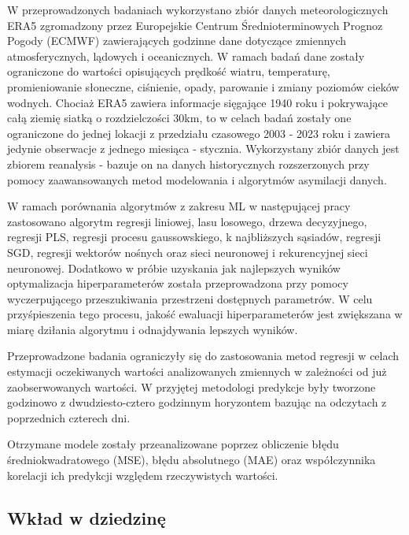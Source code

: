 W przeprowadzonych badaniach wykorzystano zbiór danych meteorologicznych ERA5
zgromadzony przez Europejskie Centrum Średnioterminowych Prognoz Pogody (ECMWF)
zawierających godzinne dane dotyczące zmiennych atmosferycznych, lądowych i
oceanicznych. W ramach badań dane zostały ograniczone do wartości opisujących
prędkość wiatru, temperaturę, promieniowanie słoneczne, ciśnienie, opady, parowanie i
zmiany poziomów cieków wodnych. Chociaż ERA5 zawiera informacje sięgające 1940
roku i pokrywające całą ziemię siatką o rozdzielczości 30km, 
to w celach badań zostały one ograniczone do jednej lokacji z przedziału czasowego 
2003 - 2023 roku i zawiera jedynie obserwacje z jednego miesiąca - stycznia. 
Wykorzystany zbiór danych jest zbiorem reanalysis - bazuje on na 
danych historycznych rozszerzonych przy pomocy zaawansowanych metod modelowania i 
algorytmów asymilacji danych.

W ramach porównania algorytmów z zakresu ML w następującej pracy zastosowano
algorytm regresji liniowej, lasu losowego, drzewa decyzyjnego, regresji PLS, 
regresji procesu gaussowskiego, k najbliższych sąsiadów, regresji SGD, 
regresji wektorów nośnych oraz sieci neuronowej i rekurencyjnej sieci neuronowej. 
Dodatkowo w próbie uzyskania jak najlepszych wyników optymalizacja hiperparameterów
została przeprowadzona przy pomocy wyczerpującego przeszukiwania przestrzeni 
dostępnych parametrów. W celu przyśpieszenia tego procesu, jakość ewaluacji 
hiperparameterów jest zwiększana w miarę dziłania algorytmu i odnajdywania lepszych
wyników.

Przeprowadzone badania ograniczyły się do zastosowania metod regresji w celach
estymacji oczekiwanych wartości analizowanych zmiennych w zależności
od już zaobserwowanych wartości. W przyjętej metodologi predykcje były tworzone
godzinowo z dwudziesto-cztero godzinnym horyzontem bazując na odczytach z poprzednich
czterech dni.

Otrzymane modele zostały przeanalizowane poprzez obliczenie błędu 
średniokwadratowego (MSE), błędu absolutnego (MAE) oraz współczynnika korelacji
ich predykcji względem rzeczywistych wartości.

\subsection{Wkład w dziedzinę}


